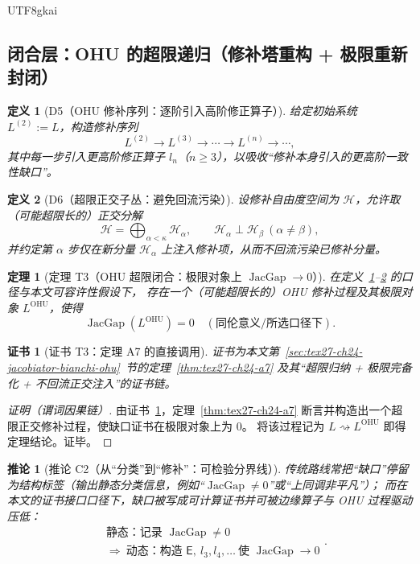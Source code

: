 \documentclass[12pt]{article}
\newtheorem{definition}{定义}[section]
\newtheorem{theorem}{定理}[section]
\newtheorem{corollary}{推论}[section]
\newtheorem{Certificate}{证书}[section]
\newcommand{\JacGap}{\operatorname{JacGap}}
\begin{document}
\begin{CJK*}{UTF8}{gkai}
\subsection{闭合层：OHU 的超限递归（修补塔重构 + 极限重新封闭）}
\label{subsec:tex27-ch28-closure}

\begin{definition}[D5（OHU 修补序列：逐阶引入高阶修正算子）]
\label{def:tex27-ch28-d5}
给定初始系统 $L^{(2)}:=L$，构造修补序列
\[
  L^{(2)}\to L^{(3)}\to \cdots \to L^{(n)}\to\cdots,
\]
其中每一步引入更高阶修正算子 $l_n$（$n\ge 3$），以吸收“修补本身引入的更高阶一致性缺口”。
\end{definition}

\begin{definition}[D6（超限正交子丛：避免回流污染）]
\label{def:tex27-ch28-d6}
设修补自由度空间为 $\mathcal H$，允许取（可能超限长的）正交分解
\[
  \mathcal H=\bigoplus_{\alpha<\kappa}\mathcal H_\alpha,
  \qquad
  \mathcal H_\alpha\perp\mathcal H_\beta\ (\alpha\neq\beta),
\]
并约定第 $\alpha$ 步仅在新分量 $\mathcal H_\alpha$ 上注入修补项，从而不回流污染已修补分量。
\end{definition}

\begin{theorem}[定理 T3（OHU 超限闭合：极限对象上 \texorpdfstring{$\JacGap\to 0$}{JacGap->0}）]
\label{thm:tex27-ch28-t3}
在定义~\ref{def:tex27-ch28-d5}--\ref{def:tex27-ch28-d6} 的口径与本文可容许性假设下，
存在一个（可能超限长的）OHU 修补过程及其极限对象 $L^{\mathrm{OHU}}$，使得
\[
  \JacGap(L^{\mathrm{OHU}})=0
  \quad(\text{同伦意义/所选口径下}).
\]
\end{theorem}

\begin{Certificate}[证书 T3：定理 A7 的直接调用]
\label{cert:tex27-ch28-t3}
证书为本文第~\ref{sec:tex27-ch24-jacobiator-bianchi-ohu}~节的定理~\ref{thm:tex27-ch24-a7} 及其“超限归纳 + 极限完备化 + 不回流正交注入”的证书链。
\end{Certificate}

\begin{proof}[证明（谓词因果链）]
由证书~\ref{cert:tex27-ch28-t3}，定理~\ref{thm:tex27-ch24-a7} 断言并构造出一个超限正交修补过程，使缺口证书在极限对象上为 $0$。
将该过程记为 $L\rightsquigarrow L^{\mathrm{OHU}}$ 即得定理结论。证毕。
\end{proof}

\begin{corollary}[推论 C2（从“分类”到“修补”：可检验分界线）]
\label{cor:tex27-ch28-c2}
传统路线常把“缺口”停留为结构标签（输出静态分类信息，例如“$\JacGap\neq 0$”或“上同调非平凡”）；
而在本文的证书接口口径下，缺口被写成可计算证书并可被边缘算子与 OHU 过程驱动压低：
\[
  \boxed{\begin{aligned}
    &\text{静态：记录 }\JacGap\neq 0\\
    &\Longrightarrow\ \text{动态：构造 }\mathsf E,\ l_3,l_4,\dots\ \text{使 }\JacGap\to 0
  \end{aligned}}.
\]
\end{corollary}


\end{CJK*}
\end{document}
